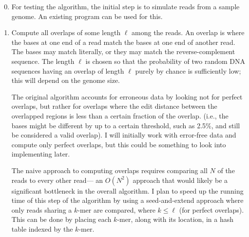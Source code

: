 \documentclass[letterpaper,12pt]{article}
\begin{document}
\begin{enumerate}
\setcounter{enumi}{-1}
\item For testing the algorithm, the initial step is to simulate reads from a
sample genome.  An existing program can be used for this.
\item Compute all overlaps of some length $\ell$ among the reads.  An overlap is
where the bases at one end of a read match the bases at one end of another read.
The bases may match literally, or they may match the reverse-complement
sequence.  The length $\ell$ is chosen so that the probability of two random DNA
sequences having an overlap of length $\ell$ purely by chance is sufficiently
low; this will depend on the genome size.

The original algorithm accounts for erroneous data by looking not for perfect
overlaps, but rather for overlaps where the edit distance between the overlapped
regions is less than a certain fraction of the overlap.  (i.e., the bases might
be different by up to a certain threshold, such as 2.5\%, and still be
considered a valid overlap).  I will initially work with error-free data and
compute only perfect overlaps, but this could be something to look into
implementing later.

The naive approach to computing overlaps requires comparing all $N$ of the reads
to every other read--- an $O(N^2)$ approach that would likely be a significant
bottleneck in the overall algorithm.  I plan to speed up the running time of
this step of the algorithm by using a seed-and-extend approach where only reads
sharing a $k$-mer are compared, where $k \le \ell$ (for perfect overlaps).  This
can be done by placing each $k$-mer, along with its location, in a hash table
indexed by the $k$-mer.


\end{enumerate}
\end{document}
